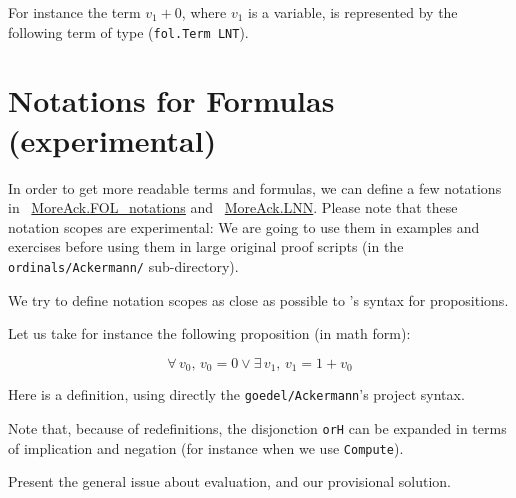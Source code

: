





For instance the term $v_1+0$, where $v_1$ is a variable,
is represented by the following \gallina term of type 
(\texttt{fol.Term LNT}).








\section{Notations for Formulas (experimental)}

In order to get more readable terms and formulas, we can define a few notations in ~\href{../theories/html/hydras.MoreAck.FOL_notations.html}{MoreAck.FOL\_notations} and
~\href{../theories/html/hydras.MoreAck.LNN.html}{MoreAck.LNN}.
Please note that these notation scopes are experimental: We are going to use them in examples and exercises before using them in large original proof scripts (in the \texttt{ordinals/Ackermann/} sub-directory).

We try to define notation scopes as close as possible to \coq's syntax for propositions.

Let us take for instance the following proposition (in math form):

$$\forall\, v_0,\, v_0=0\vee \exists\,v_1,\,v_1=1+v_0$$

Here is a definition, using directly the \texttt{goedel/Ackermann}'s project syntax.


Note that, because of redefinitions, the disjonction \texttt{orH}
can be expanded in terms of  implication and negation (for instance when we use \texttt{Compute}).

\begin{todo}
  Present the general issue about evaluation, and our provisional solution.
\end{todo}






